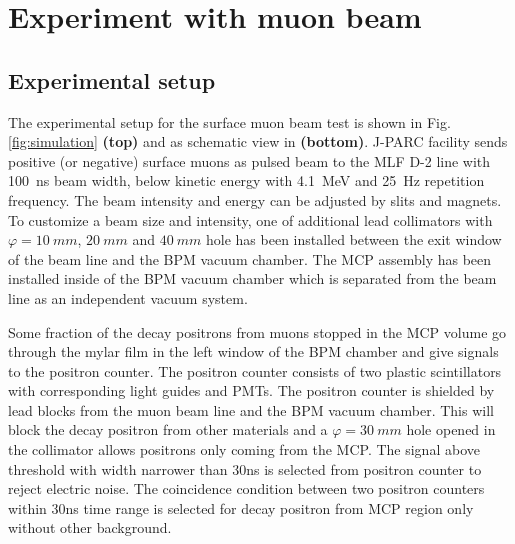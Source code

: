 \documentclass[preprint,3p,twocolumn]{elsarticle}
\begin{document}
\section{Experiment with muon beam}

\subsection{Experimental setup} 

The experimental setup for the surface muon beam test is shown in Fig.\ref{fig:simulation} {\bf (top)} and as schematic view in {\bf (bottom)}.
J-PARC facility sends positive (or negative) surface muons as pulsed beam to the MLF D-2 line with \SI{100}{\nano\s} beam width, below kinetic energy with \SI{4.1}{MeV} and \SI{25}{\hertz} repetition frequency.
The beam intensity and energy can be adjusted by slits and magnets.
To customize a beam size and intensity, one of additional lead collimators with $\varphi=\SI{10}{mm}$, $\SI{20}{mm}$ and $\SI{40}{mm}$ hole has been installed between the exit window of the beam line and the BPM vacuum chamber.
The MCP assembly has been installed inside of the BPM vacuum chamber which is separated from the beam line as an independent vacuum system.

Some fraction of the decay positrons from muons stopped in the MCP volume go through the mylar film in the left window of the BPM chamber and give signals to the positron counter. 
The positron counter consists of two plastic scintillators with corresponding light guides and PMTs. %
The positron counter is shielded by lead blocks from the muon beam line and the BPM vacuum chamber. This will block the decay positron from other materials and a $\varphi=\SI{30}{mm}$ hole opened in the collimator allows positrons only coming from the MCP.
The signal above threshold with width narrower than 30ns is selected from positron counter to reject electric noise. 
The coincidence condition between two positron counters within 30ns time range is selected for decay positron from MCP region only without other background.
\end{document}
